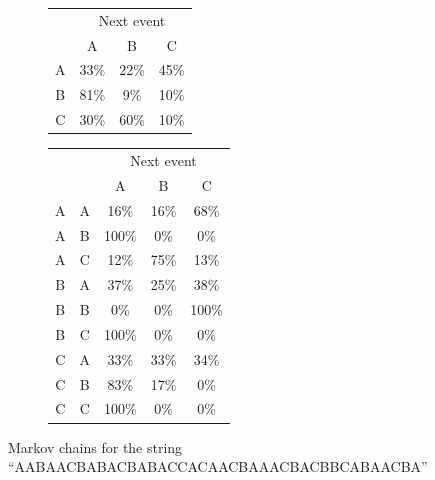 \documentclass[]{article}
\begin{document}
                \begin{figure}[h]
                    \begin{center}
                        \begin{subfigure}[a]{0.4\textwidth}
                            \begin{tabular}{|c|c|c|c|}
                                \hline
                                & \multicolumn{3}{|c|}{Next event} \\ \cline{2-4}
                                & A & B & C \\ \hline
                                A & 33\% & 22\% & 45\% \\ \hline
                                B & 81\% & 9\% & 10\% \\ \hline
                                C & 30\% & 60\% & 10\% \\ \hline
                            \end{tabular}
                        \end{subfigure}
                        \begin{subfigure}[b]{0.4\textwidth}
                            \begin{tabular}{|c|c|c|c|c|}
                                \hline
                                \multicolumn{2}{|c|}{} & \multicolumn{3}{|c|}{Next event} \\ \cline{3-5}
                                \multicolumn{2}{|c|}{} & A & B & C \\ \hline
                                A & A & 16\% & 16\% & 68\% \\ \hline
                                A & B & 100\% & 0\% & 0\% \\ \hline
                                A & C & 12\% & 75\% & 13\% \\ \hline
                                B & A & 37\% & 25\% & 38\% \\ \hline
                                B & B & 0\% & 0\% & 100\% \\ \hline
                                B & C & 100\% & 0\% & 0\% \\ \hline
                                C & A & 33\% & 33\% & 34\% \\ \hline
                                C & B & 83\% & 17\% & 0\% \\ \hline
                                C & C & 100\% & 0\% & 0\% \\ \hline
                            \end{tabular}
                        \end{subfigure}
                    \end{center}
                    \caption{Markov chains for the string \\``AABAACBABACBABACCACAACBAAACBACBBCABAACBA''}
                    \label{fig:markov}
                \end{figure}
                \newpage
\end{document}
